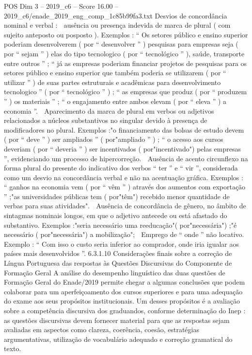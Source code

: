 \begin{textsample}{POS Dim 3 – 2019\_c6 – Score 16.00 – 2019\_c6/enade\_2019\_eng\_comp\_1c85b99fa3.txt}
Desvios de concordância nominal e verbal :  ausência ou presença indevida de marca de plural ( com sujeito anteposto ou posposto ).
Exemplos : “ Os setores público e ensino superior poderiam desenvolverem ( por “ desenvolver ” ) pesquisas para empresas seja ( por “ sejam ” ) elas do tipo tecnologico ( por “ tecnológico ” ), saúde, transporte entre outros ” ; “ já as empresas poderiam financiar projetos de pesquisas para os setores público e ensino superior que também poderia se utilizarem ( por “ utilizar ” ) de suas partes estruturais e acadêmicas para desenvolvimento tecnologico ” ( por “ tecnológico ” ) ; “ as empresas que produz ( por “ produzem ” ) os materiais ” ; “ o engajamento entre ambos elevam ( por “ eleva ” ) a economia ”.  Aparecimento da marca de plural em verbos ou adjetivos relacionados a núcleos substantivos no singular devido à presença de modificadores no plural.
Exemplos :"o financiamento das bolsas de estudo devem ( por “ deve ” ) ser ampliados ” ( por"ampliado ” ) ; “ o acesso aos cursos deveriam ( por “ deveria ” ) ser incentivados ( por"incentivado") pelas empresas ”, evidenciando um processo de hipercorreção.  Ausência de acento circunflexo na forma plural do presente do indicativo dos verbos “ ter ” e “ vir ”, considerada como um desvio na concordância verbal e não na acentuação gráfica.
Exemplos : “ ganhos na economia vem ( por “ vêm ” ) através dos aumentos com exportação ” ;"as universidades públicas tem ( por"têm") recebido menor quantidade de verbas para suas atividades".  Ausência de concordância de gênero, no âmbito de sintagmas nominais longos, em que o adjetivo antecede ou está afastado do substantivo.
Exemplos :"seria necessário uma reeducação"( por"necessária") ;"é necessário ( por"necessária") a mobilização";  Emprego de “ onde ” não locativo.
Exemplo : “ Com isso o custo seria inferior ao comprador, onde iria igualar aos países mais desenvolvidos ”. 6.3.1.10 Considerações finais sobre a correção de Língua Portuguesa das respostas às Questões Discursivas do Componente de Formação Geral A análise do desempenho linguístico das duas questões de Formação Geral do Enade/2019 permite chegar a algumas conclusões que podem colaborar para um aperfeiçoamento dos cursos superiores e para uma adequação do exame aos seus propósitos institucionais.
Um desses propósitos é a avaliação sobre a competência discursiva dos graduandos, conforme determinação do Inep : as questões discursivas devem fornecer material para que as respostas sejam avaliadas em aspectos como clareza, coerência, coesão, estratégias argumentativas, utilização de vocabulário adequado e correção gramatical do texto.

\end{textsample}
